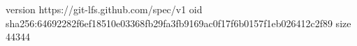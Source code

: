 version https://git-lfs.github.com/spec/v1
oid sha256:64692282f6ef18510e03368fb29fa3fb9169ac0f17f6b0157f1eb026412c2f89
size 44344
